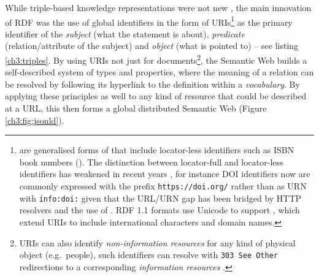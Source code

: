While triple-based knowledge representations were not new \cite{Stanczyk 1987}, the main innovation of RDF was the use of global identifiers in the form of URIs\footnote{ \cite{Berners-Lee 2005} are generalised forms of  that include locator-less identifiers such as ISBN book numbers (). The distinction between locator-full and locator-less identifiers has weakened in recent years \cite{OCLC 2010}, for instance \acrshort{DOI} identifiers now are commonly expressed with the prefix \texttt{https://doi.org/} rather than as URN with \texttt{info:doi:} given that the URL/URN gap has been bridged by HTTP resolvers and the use of  \cite{Juty 2011}. RDF 1.1 formats use Unicode to support  \cite{Dürst 2005}, which extend URIs to include international characters and domain names.} as the primary identifier of the \emph{subject} (what the statement is about), \emph{predicate} (relation/attribute of the subject) and \emph{object} (what is pointed to) -- see listing \vref{ch3:triples}. By using URIs not just for documents\footnote{URIs can also identify \emph{non-information resources} for any kind of physical object (e.g.~people), such identifiers can resolve with \texttt{303\ See\ Other} redirections to a corresponding \emph{information resources} \cite{Sauermann 2008}.}, the Semantic Web builds a self-described system of types and properties, where the meaning of a relation can be resolved by following its hyperlink to the definition within a \emph{vocabulary}. By applying these principles as well to any kind of resource that could be described at a URL, this then forms a global distributed Semantic Web (Figure \vref{ch3:fig:jsonld}).


